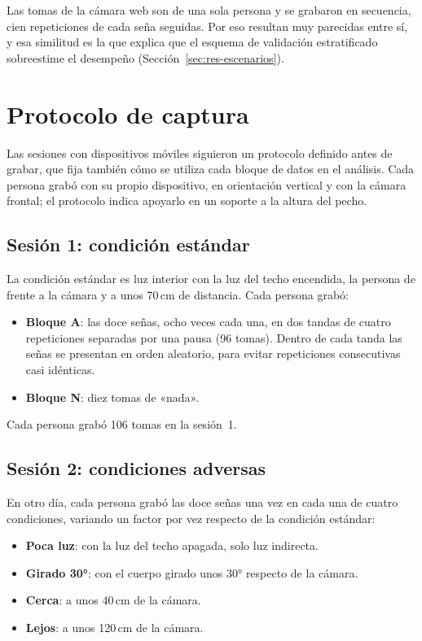 Las tomas de la cámara web son de una sola persona y se grabaron en secuencia, cien repeticiones de cada seña seguidas. Por eso resultan muy parecidas entre sí, y esa similitud es la que explica que el esquema de validación estratificado sobreestime el desempeño (Sección~\ref{sec:res-escenarios}).

\section{Protocolo de captura}
\label{sec:protocolo-captura}

Las sesiones con dispositivos móviles siguieron un protocolo definido antes de grabar, que fija también cómo se utiliza cada bloque de datos en el análisis. Cada persona grabó con su propio dispositivo, en orientación vertical y con la cámara frontal; el protocolo indica apoyarlo en un soporte a la altura del pecho.

\subsection{Sesión 1: condición estándar}

La condición estándar es luz interior con la luz del techo encendida, la persona de frente a la cámara y a unos 70\,cm de distancia. Cada persona grabó:

\begin{itemize}
    \item \textbf{Bloque A}: las doce señas, ocho veces cada una, en dos tandas de cuatro repeticiones separadas por una pausa (96 tomas). Dentro de cada tanda las señas se presentan en orden aleatorio, para evitar repeticiones consecutivas casi idénticas.
    \item \textbf{Bloque N}: diez tomas de «nada».
\end{itemize}

Cada persona grabó 106 tomas en la sesión~1.

\subsection{Sesión 2: condiciones adversas}

En otro día, cada persona grabó las doce señas una vez en cada una de cuatro condiciones, variando un factor por vez respecto de la condición estándar:

\begin{itemize}
    \item \textbf{Poca luz}: con la luz del techo apagada, solo luz indirecta.
    \item \textbf{Girado 30°}: con el cuerpo girado unos 30° respecto de la cámara.
    \item \textbf{Cerca}: a unos 40\,cm de la cámara.
    \item \textbf{Lejos}: a unos 120\,cm de la cámara.
\end{itemize}

